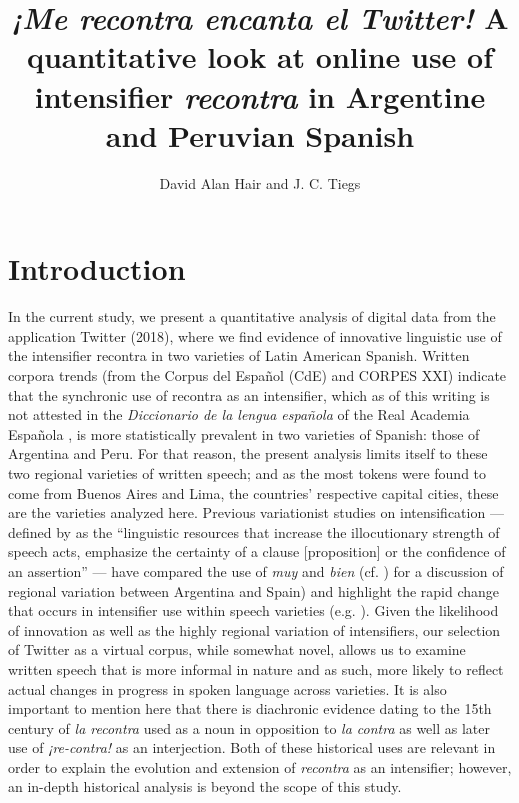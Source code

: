 \documentclass[output=paper,colorlinks,citecolor=brown,
]{langscibook}
\author{David Alan Hair\affiliation{University of North Georgia} and J. C. Tiegs\affiliation{University of Arizona}\orcid{https://orcid.org/0000-0002-0788-8917}}
\title{\textit{¡Me recontra encanta el Twitter!} A quantitative look at online use of intensifier \textit{recontra} in Argentine and Peruvian Spanish}
\begin{document}
\maketitle

\section{Introduction}
In the current study, we present a quantitative analysis of digital data from the application Twitter (2018), where we find evidence of innovative linguistic use of the intensifier recontra in two varieties of Latin American Spanish. Written corpora trends (from the Corpus del Español (CdE) and CORPES XXI) indicate that the synchronic use of recontra as an intensifier, which as of this writing is not attested in the \textit{Diccionario de la lengua española} of the Real Academia Española \citep{RAECORDE}, is more statistically prevalent in two varieties of Spanish: those of Argentina and Peru. For that reason, the present analysis limits itself to these two regional varieties of written speech; and as the most tokens were found to come from Buenos Aires and Lima, the countries’ respective capital cities, these are the varieties analyzed here. Previous variationist studies on intensification — defined by \cite[372]{munoz2018estrategias} as the 
``linguistic resources that increase the illocutionary strength of speech acts, emphasize the certainty of a clause [proposition] or the confidence of an assertion'' —  have compared the use of \textit{{muy}} and \textit{bien} (cf. \citealt{KanwitSarrió2017}) for a discussion of regional variation between Argentina and Spain) and highlight the rapid change that occurs in intensifier use within speech varieties (e.g. \citet{Tagliamonte2012}). Given the likelihood of innovation as well as the highly regional variation of intensifiers, our selection of Twitter as a virtual corpus, while somewhat novel, allows us to examine written speech that is more informal in nature and as such, more likely to reflect actual changes in progress in spoken language across varieties. It is also important to mention here that there is diachronic evidence dating to the 15th century \citep{RAECORDE} of \textit{la recontra} used as a noun in opposition to \textit{la contra} as well as later use of \textit{¡re-contra!} as an interjection. Both of these historical uses are relevant in order to explain the evolution and extension of \textit{recontra} as an intensifier; however, an in-depth historical analysis is beyond the scope of this study. 
\end{document}
